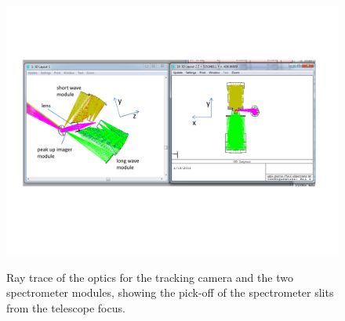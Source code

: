 
\begin{figure}[t]
\vspace{0.35in}
  \begin{center}
    \includegraphics[width=6.5in]{tracking_camera_placeholder.pdf}
    \captionbaseline\caption{\small Ray trace of the optics for the tracking camera and the two spectrometer modules, showing the pick-off of the spectrometer slits from the telescope focus.}
    \linefig\label{fig:TrackingCamera}
  \end{center}
\end{figure}

